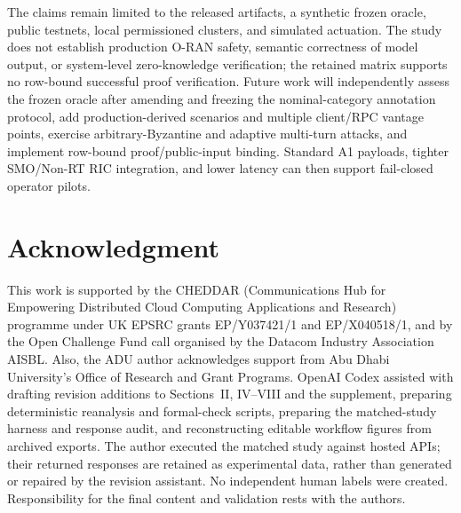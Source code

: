 \documentclass[journal]{IEEEtran}
\newif\ifshowrevisions
\newenvironment{revision}{\begingroup\ifshowrevisions\color{blue}\else\color{black}\fi}{\endgroup}
\newcommand{\rev}[1]{{\ifshowrevisions\color{blue}\else\color{black}\fi #1}}
\begin{document}
\begin{revision}
The claims remain limited to the released artifacts, a synthetic frozen
oracle, public testnets, local permissioned clusters, and simulated actuation.
The study does not establish production O-RAN safety, semantic correctness of
model output, or system-level zero-knowledge verification; the retained matrix
supports no row-bound successful proof verification. Future work will independently assess
the frozen oracle after amending and freezing the nominal-category annotation
protocol, add
production-derived scenarios and multiple client/RPC vantage points, exercise
arbitrary-Byzantine and adaptive multi-turn attacks, and implement row-bound
proof/public-input binding. Standard A1 payloads, tighter SMO/Non-RT RIC
integration, and lower latency can then support fail-closed operator pilots.
\end{revision}
\section*{Acknowledgment}
This work is supported by the CHEDDAR (Communications Hub for Empowering
Distributed Cloud Computing Applications and Research) programme under UK
EPSRC grants EP/Y037421/1 and EP/X040518/1, and by the Open Challenge Fund
call organised by the Datacom Industry Association AISBL. Also, the ADU author
acknowledges support from Abu Dhabi University's Office of Research and Grant Programs.
\rev{OpenAI Codex assisted with drafting revision additions to Sections~II,
IV--VIII and the supplement, preparing deterministic reanalysis and formal-check
scripts, preparing the matched-study harness and response audit, and
reconstructing editable workflow figures from archived exports. The author
executed the matched study against hosted APIs; their returned responses
are retained as experimental data, rather than generated or repaired by the
revision assistant. No independent human labels were created.
Responsibility for the final content and validation rests with the authors.}
\end{document}
